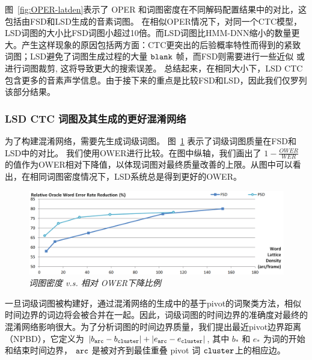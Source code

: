 图~\ref{fig:OPER-latden}表示了 OPER 和词图密度在不同解码配置结果中的对比，这包括由FSD和LSD生成的音素词图。
在相似OPER情况下，对同一个CTC模型，LSD词图的大小比FSD词图小超过10倍。而LSD词图比HMM-DNN缩小的数量更大。产生这样现象的原因包括两方面：CTC更突出的后验概率特性而得到的紧致词图；LSD避免了词图生成过程的大量 $\tt blank$ 帧，而FSD则需要进行一些近似 \cite{ljolje1999efficient} 或进行词图裁剪\cite{povey2012generating}, 这将导致更大的搜索误差。
总结起来，在相同大小下，LSD CTC包含更多的音素声学信息。由于接下来的重点是比较FSD和LSD，因此我们仅罗列该部分结果。


\subsubsection{LSD CTC 词图及其生成的更好混淆网络}


为了构建混淆网络，需要先生成词级词图。 图~\ref{fig:OWER-latden} 表示了词级词图质量在FSD和LSD中的对比。
我们使用OWER进行比较。在图中纵轴，我们画出了 $1-\frac{OWER}{WER}$ 的值作为OWER相对下降值，以体现词图对最终质量改善的上限。从图中可以看出，在相同词图密度情况下，LSD系统总是得到更好的OWER。
      \begin{figure}[tbhp!]
        \centering
        \includegraphics[width=\linewidth]{figure/OWER-latden.png}
        \caption{{\it 词图密度 v.s. 相对 OWER下降比例}}
        \label{fig:OWER-latden}
      \end{figure}
一旦词级词图被构建好，通过混淆网络的生成中的基于pivot的词聚类方法，相似时间边界的词边将会被合并在一起。因此，词级词图的时间边界的准确度对最终的混淆网络影响很大。为了分析词图的时间边界质量，我们提出最近pivot边界距离（NPBD），它定义为 $|b_{\tt arc}-b_{\tt cluster}|+|e_{\tt arc}-e_{\tt cluster}|$, 其中 $b_*$ 和 $e_*$ 为词的开始和结束时间边界， $\tt arc$ 是被对齐到最佳重叠 pivot 词 $\tt cluster$上的相应边。

